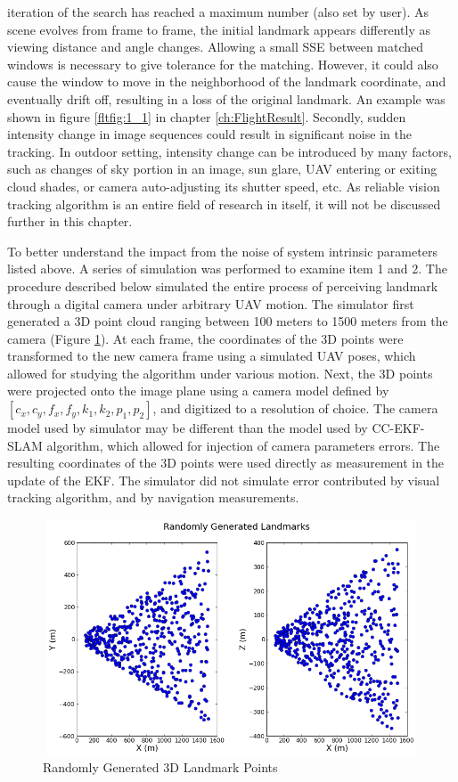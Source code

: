 \begin{enumerate}
  iteration of the search has reached a maximum number (also set by
  user). As scene evolves from frame to frame, the initial landmark
  appears differently as viewing distance and angle changes. Allowing
  a small SSE between matched windows is necessary to give tolerance
  for the matching. However, it could also cause the window to move in
  the neighborhood of the landmark coordinate, and eventually drift
  off, resulting in a loss of the original landmark. An example was
  shown in figure \ref{fltfig:1_1} in chapter \ref{ch:FlightResult}.
  Secondly, sudden intensity change in image sequences could result in
  significant noise in the tracking. In outdoor setting, intensity
  change can be introduced by many factors, such as changes of sky
  portion in an image, sun glare, UAV entering or exiting cloud
  shades, or camera auto-adjusting its shutter speed, etc. As reliable
  vision tracking algorithm is an entire field of research in itself,
  it will not be discussed further in this chapter.

\end{enumerate}

To better understand the impact from the noise of system intrinsic
parameters listed above. A series of simulation was performed to
examine item 1 and 2. The procedure described below simulated the
entire process of perceiving landmark through a digital camera under
arbitrary UAV motion. The simulator first generated a 3D point cloud
ranging between 100 meters to 1500 meters from the camera (Figure
\ref{fig:simfig51}). At each frame, the coordinates of the 3D points
were transformed to the new camera frame using a simulated UAV poses,
which allowed for studying the algorithm under various motion. Next,
the 3D points were projected onto the image plane using a camera model
defined by $[c_{x}, c_{y}, f_{x}, f_{y}, k_{1}, k_{2}, p_{1}, p_{2}]$,
and digitized to a resolution of choice. The camera model used by
simulator may be different than the model used by CC-EKF-SLAM
algorithm, which allowed for injection of camera parameters errors.
The resulting coordinates of the 3D points were used directly as
measurement in the update of the EKF. The simulator did not simulate 
error contributed by visual tracking algorithm, and by navigation
measurements.

\begin{figure}[h]
\centering
\includegraphics[width=12cm, height=7cm]{./Figures/SimulationFigures/Figure51.png}
\caption{Randomly Generated 3D Landmark Points}
\label{fig:simfig51}
\end{figure}
\FloatBarrier

